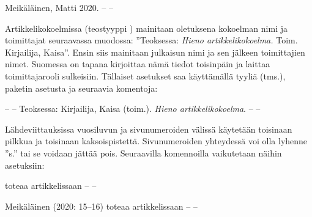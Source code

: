 \begin{koodilohkosis}
\usepackage[style=ext-authoryear]{biblatex}

\end{koodilohkosis}

\begin{tulossis}
  Meikäläinen, Matti 2020. -- --
\end{tulossis}

Artikkelikokoelmissa (teostyyppi ) mainitaan
oletuksena kokoelman nimi ja toimittajat seuraavassa muodossa:
''Teoksessa: \textit{Hieno artikkelikokoelma.} Toim. Kirjailija,
Kaisa''. Ensin siis mainitaan julkaisun nimi ja sen jälkeen toimittajien
nimet. Suomessa on tapana kirjoittaa nämä tiedot toisinpäin ja laittaa
toimittajarooli sulkeisiin. Tällaiset asetukset saa käyttämällä tyyliä
 (tms.), paketin asetusta
 ja seuraavia komentoja:

\begin{koodilohkosis}
\usepackage[style=ext-authoryear, innamebeforetitle=true]{biblatex}

\end{koodilohkosis}

\begin{tulossis}
  -- -- Teoksessa: Kirjailija, Kaisa (toim.). \textit{Hieno
    artikkelikokoelma}. -- --
\end{tulossis}

Lähdeviittauksissa vuosiluvun ja sivunumeroiden välissä käytetään
toisinaan pilkkua ja toisinaan kaksoispistettä. Sivunumeroiden
yhteydessä voi olla lyhenne ''s.'' tai se voidaan jättää pois.
Seuraavilla komennoilla vaikutetaan näihin asetuksiin:

\begin{koodilohkosis}

\textcite[15--16]{tunniste} toteaa artikkelissaan -- --
\end{koodilohkosis}

\begin{tulossis}
  Meikäläinen (2020: 15--16) toteaa artikkelissaan -- --
\end{tulossis}

